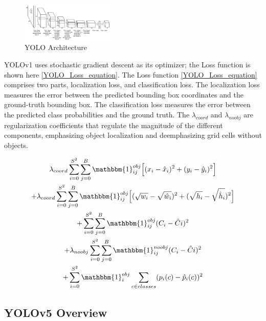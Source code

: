\documentclass[10pt,twocolumn,letterpaper]{article}
\begin{document}
\begin{figure}[h]
    \centering
    \includegraphics[width=0.4\textwidth]{figures/YOLOv1 Architecture.png}
    \caption{YOLO Architecture \cite{YOLO_OG}}
    \label{fig:YOLOv1Architecture}
\end{figure}


YOLOv1 uses stochastic gradient descent as its optimizer; the Loss function is shown here \ref{YOLO_Loss_equation}. The Loss function \ref{YOLO_Loss_equation} comprises two parts, localization loss, and classification loss. The localization loss measures the error between the predicted bounding box coordinates and the ground-truth bounding box. The classification loss measures the error between the predicted class probabilities and the ground truth. The $\lambda_{coord}$ and $\lambda_{noobj}$ are regularization coefficients that regulate the magnitude of the different components, emphasizing object localization and deemphasizing grid cells without objects. 

\begin{multline} \label{YOLO_Loss_equation}
\lambda_{coord}\sum_{i=0}^{S^2}\sum_{j=0}^{B}\mathbbm{1}_{ij}^{obj}\Big[(x_i-\hat{x}_i)^2+(y_i-\hat{y}_i)^2\Big] \\ + \lambda_{coord}\sum_{i=0}^{S^2}\sum_{j=0}^{B}\mathbbm{1}_{ij}^{obj}\Big[(\sqrt{w_i}-\sqrt{\hat{w}_i})^2+(\sqrt{h_i}-\sqrt{\hat{h}_i})^2\Big]\\
+\sum_{i=0}^{S^2}\sum_{j=0}^{B}\mathbbm{1}_{ij}^{obj}(C_i-\hat{C}i)^2\\
+\lambda_{noobj}\sum_{i=0}^{S^2}\sum_{j=0}^{B}\mathbbm{1}_{ij}^{noobj}(C_i-\hat{C}i)^2\\
+\sum_{i=0}^{S^2}\mathbbm{1}_{i}^{obj}\sum_{c\in classes}(p_i(c)-\hat{p}_i(c))^2
\end{multline}

\subsection{YOLOv5 Overview}
\end{document}
